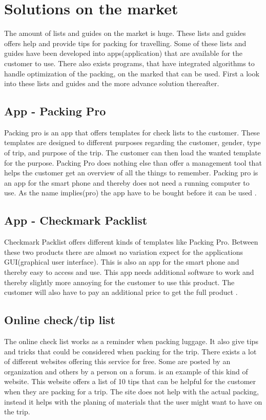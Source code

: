 \section{Solutions on the market}

The amount of lists and guides on the market is huge. These lists and guides offers help and provide tips for packing for travelling. Some of these lists and guides have been developed into apps(application) that are available for the customer to use.
There also exists programs, that have integrated algorithms to handle optimization of the packing, on the marked that can be used.
First a look into these lists and guides and the more advance solution thereafter.

\subsection{App - Packing Pro}

Packing pro is an app that offers templates for check lists to the customer. These templates are designed to different purposes regarding the customer, gender, type of trip, and purpose of the trip.
The customer can then load the wanted template for the purpose. Packing Pro does nothing else than offer a management tool that helps the customer get an overview of all the things to remember. Packing pro is an app for the smart phone and thereby does not need a running computer to use. As the name implies(pro) the app have to be bought before it can be used \citep{packingpro}.

\subsection{App - Checkmark Packlist}

Checkmark Packlist offers different kinds of templates like Packing Pro. Between these two products there are almost no variation expect for the applications GUI(graphical user interface). This is also an app for the smart phone and thereby easy to access and use.
This app needs additional software to work and thereby slightly more annoying for the customer to use this product. The customer will also have to pay an additional price to get the full product \citep{checkpacklist}.

\subsection{Online check/tip list}

The online check list works as a reminder when packing luggage. It also give tips and tricks that could be considered when packing for the trip. There exists a lot of different websites offering this service for free. Some are posted by an organization and others by a person on a forum.
\citep{onlinecheck} is an example of this kind of website. This website offers a list of 10 tips that can be helpful for the customer when they are packing for a trip. The site does not help with the actual packing, instead it helps with the planing of materials that the user might want to have on the trip.

